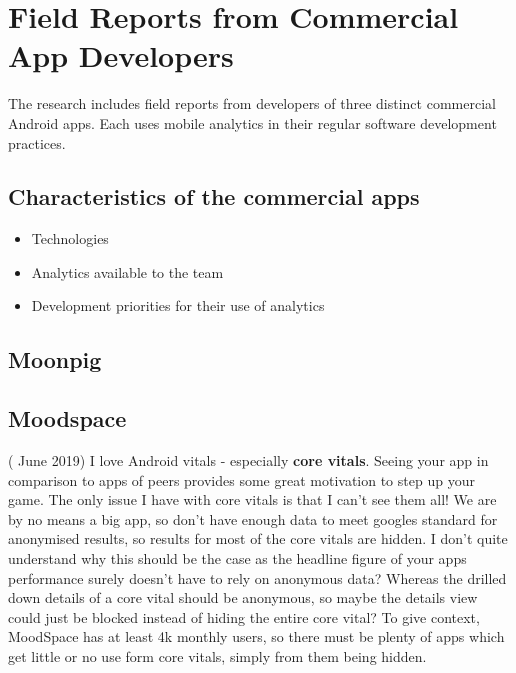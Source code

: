 \section{Field Reports from Commercial App Developers}
The research includes field reports from developers of three distinct commercial Android apps. Each uses mobile analytics in their regular software development practices.

\subsection{Characteristics of the commercial apps}

\begin{itemize}
    \item Technologies
    \item Analytics available to the team
    \item Development priorities for their use of analytics
\end{itemize}

\subsection{Moonpig}


\subsection{Moodspace}
( June 2019)
I love Android vitals - especially \textbf{core vitals}. Seeing your app in comparison to apps of peers provides some great motivation to step up your game. The only issue I have with core vitals is that I can't see them all! We are by no means a big app, so don't have enough data to meet googles standard for anonymised results, so results for most of the core vitals are hidden. I don't quite understand why this should be the case as the headline figure of your apps performance surely doesn't have to rely on anonymous data? Whereas the drilled down details of a core vital should be anonymous, so maybe the details view could just be blocked instead of hiding the entire core vital? To give context, MoodSpace has at least 4k monthly users, so there must be plenty of apps which get little or no use form core vitals, simply from them being hidden.

